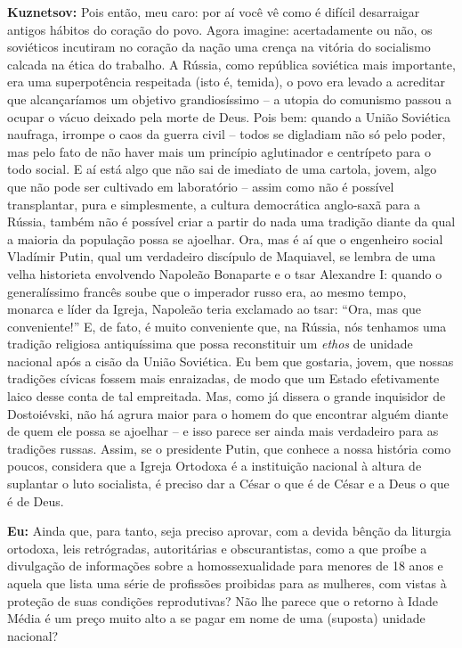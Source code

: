 \textbf{Kuznetsov:} Pois então, meu caro: por aí você vê como é difícil
desarraigar antigos hábitos do coração do povo. Agora imagine:
acertadamente ou não, os soviéticos incutiram no coração da nação uma
crença na vitória do socialismo calcada na ética do trabalho. A Rússia,
como república soviética mais importante, era uma superpotência
respeitada (isto é, temida), o povo era levado a acreditar que
alcançaríamos um objetivo grandiosíssimo -- a utopia do comunismo passou
a ocupar o vácuo deixado pela morte de Deus. Pois bem: quando a União
Soviética naufraga, irrompe o caos da guerra civil -- todos se digladiam
não só pelo poder, mas pelo fato de não haver mais um princípio
aglutinador e centrípeto para o todo social. E aí está algo que não sai
de imediato de uma cartola, jovem, algo que não pode ser cultivado em
laboratório -- assim como não é possível transplantar, pura e
simplesmente, a cultura democrática anglo-saxã para a Rússia, também não
é possível criar a partir do nada uma tradição diante da qual a maioria
da população possa se ajoelhar. Ora, mas é aí que o engenheiro social
Vladímir Putin, qual um verdadeiro discípulo de Maquiavel, se lembra de
uma velha historieta envolvendo Napoleão Bonaparte e o tsar Alexandre I:
quando o generalíssimo francês soube que o imperador russo era, ao mesmo
tempo, monarca e líder da Igreja, Napoleão teria exclamado ao tsar:
``Ora, mas que conveniente!'' E, de fato, é muito conveniente que, na
Rússia, nós tenhamos uma tradição religiosa antiquíssima que possa
reconstituir um \emph{ethos} de unidade nacional após a cisão da União
Soviética. Eu bem que gostaria, jovem, que nossas tradições cívicas
fossem mais enraizadas, de modo que um Estado efetivamente laico desse
conta de tal empreitada. Mas, como já dissera o grande inquisidor de
Dostoiévski, não há agrura maior para o homem do que encontrar alguém
diante de quem ele possa se ajoelhar -- e isso parece ser ainda mais
verdadeiro para as tradições russas. Assim, se o presidente Putin, que
conhece a nossa história como poucos, considera que a Igreja Ortodoxa é
a instituição nacional à altura de suplantar o luto socialista, é
preciso dar a César o que é de César e a Deus o que é de Deus.

\textbf{Eu:} Ainda que, para tanto, seja preciso aprovar, com a devida
bênção da liturgia ortodoxa, leis retrógradas, autoritárias e
obscurantistas, como a que proíbe a divulgação de informações sobre a
homossexualidade para menores de 18 anos e aquela que lista uma série de
profissões proibidas para as mulheres, com vistas à proteção de suas
condições reprodutivas? Não lhe parece que o retorno à Idade Média é um
preço muito alto a se pagar em nome de uma (suposta) unidade nacional?


